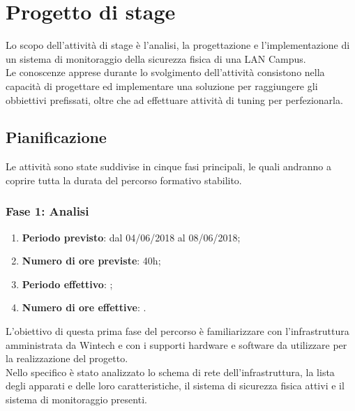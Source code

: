 \documentclass[Tesi.tex]{subfiles}
\begin{document}
\chapter{Progetto di stage}
Lo scopo dell'attività di stage è l’analisi, la progettazione e l'implementazione di un sistema di monitoraggio della sicurezza fisica di una LAN Campus. \\
Le conoscenze apprese durante lo svolgimento dell'attività consistono nella capacità di progettare ed implementare una soluzione per raggiungere gli obbiettivi prefissati, oltre che ad effettuare attività di tuning per perfezionarla.


\section{Pianificazione}
Le attività sono state suddivise in cinque fasi principali, le quali andranno a coprire tutta la durata del percorso formativo stabilito.

\subsection{Fase 1: Analisi}
\begin{enumerate}
	\item \textbf{Periodo previsto}: dal 04/06/2018 al 08/06/2018;
	\item \textbf{Numero di ore previste}: 40h;
	\item \textbf{Periodo effettivo}: ;
	\item \textbf{Numero di ore effettive}: .
\end{enumerate}

L'obiettivo di questa prima fase del percorso è familiarizzare con l'infrastruttura amministrata da Wintech e con i supporti hardware e software da utilizzare per la realizzazione del progetto. \\
Nello specifico è stato analizzato lo schema di rete dell'infrastruttura, la lista degli apparati e delle loro caratteristiche, il sistema di sicurezza fisica attivi e il sistema di monitoraggio presenti. 
\end{document}
